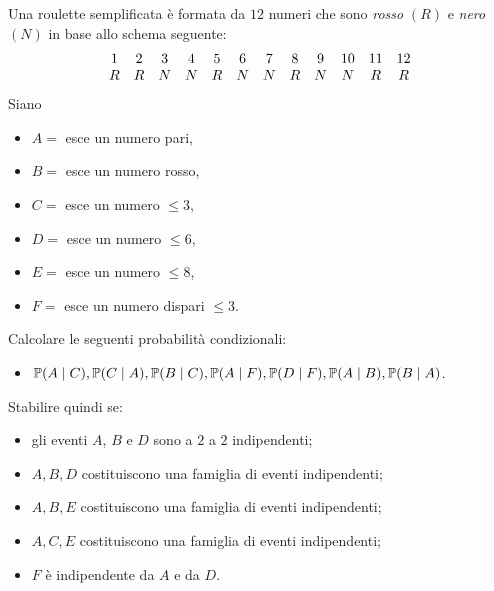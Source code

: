 Una roulette semplificata è formata da $12$ numeri che sono \emph{rosso} $( R)$ e \emph{nero} $( N)$ in base allo schema seguente:
\begin{equation*}
\begin{array}{ c c c c c c c c c c c c }
1 & 2 & 3 & 4 & 5 & 6 & 7 & 8 & 9 & 10 & 11 & 12\\
R & R & N & N & R & N & N & R & N & N & R & R
\end{array}
\end{equation*}
Siano
\begin{itemize}
\item $A=$ esce un numero pari,
\item $B=$ esce un numero rosso,
\item $C=$ esce un numero $\leq 3$,
\item $D=$ esce un numero $\leq 6$,
\item $E=$ esce un numero $\leq 8$,
\item $F=$ esce un numero dispari $\leq 3$.
\end{itemize}

Calcolare le seguenti probabilità condizionali:
\begin{itemize}
\item $\mathbb{P}( A\mid C) ,\mathbb{P}( C\mid A) ,\mathbb{P}( B\mid C) ,\mathbb{P}( A\mid F) ,\mathbb{P}( D\mid F) ,\mathbb{P}( A\mid B) ,\mathbb{P}( B\mid A)$.
\end{itemize}

Stabilire quindi se:
\begin{itemize}
\item gli eventi $A$, $B$ e $D$ sono a $2$ a $2$ indipendenti;
\item $A,B,D$ costituiscono una famiglia di eventi indipendenti;
\item $A,B,E$ costituiscono una famiglia di eventi indipendenti;
\item $A,C,E$ costituiscono una famiglia di eventi indipendenti;
\item $F$ è indipendente da $A$ e da $D$.
\end{itemize}
\Esercizio{}

